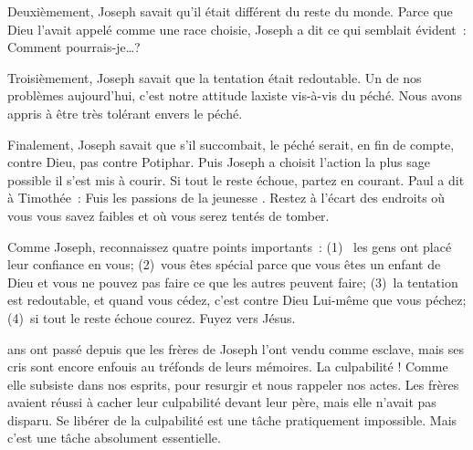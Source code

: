 Deuxièmement, Joseph savait qu'il était différent du reste du monde.
 Parce que Dieu l'avait appelé comme une race choisie,
 Joseph a dit ce qui semblait évident~: \og Comment pourrais-je\dots{}?\fg{}

Troisièmement, Joseph savait que la tentation était redoutable.
 Un de nos problèmes aujourd'hui, c'est notre attitude laxiste
 vis-à-vis du péché.
 Nous avons appris à être très tolérant envers le péché. 

Finalement, Joseph savait que s'il succombait, le péché serait,
 en fin de compte, contre Dieu, pas contre Potiphar.
 Puis Joseph a choisit l'action la plus sage possible
 \ocadr{}il s'est mis à courir.
 Si tout le reste échoue, partez en courant.
 Paul a dit à Timothée~:
 \og Fuis les passions de la jeunesse \fg{}.
 Restez à l'écart des endroits où vous vous savez faibles
 et où vous serez tentés de tomber. 


Comme Joseph, reconnaissez quatre points importants~:
 (1)~ les gens ont placé leur confiance en vous;
 (2)~vous êtes spécial parce que vous êtes un enfant de Dieu
  et vous ne pouvez pas faire ce que les autres peuvent faire;
 (3)~la tentation est redoutable, et quand vous cédez,
  c'est contre Dieu Lui-même que vous péchez;
 (4)~si tout le reste échoue \ocadr{}courez. Fuyez vers Jésus.

\dvrule






 ans ont passé depuis que les frères de Joseph
 l'ont vendu comme esclave, mais ses cris sont encore enfouis
 au tréfonds de leurs mémoires. La culpabilité !
 Comme elle subsiste dans nos esprits, pour resurgir
 et nous rappeler nos actes.
 Les frères avaient réussi à cacher leur culpabilité devant leur père,
 mais elle n'avait pas disparu.
 Se libérer de la culpabilité est une tâche pratiquement impossible.
 Mais c'est une tâche absolument essentielle. 

